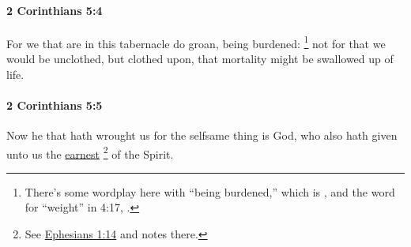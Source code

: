 		\paragraph{2 Corinthians 5:4} %
			\label{2CORINTHIANS-5-4}

			For we that are in this tabernacle do groan, being burdened:%
				\footnote{%
					There's some wordplay here with ``being burdened,'' which is , and the word for ``weight'' in 4:17, .
					}
			not for that we would be unclothed, but clothed upon, that mortality might be swallowed up of life.

			\begin{framed}
			\scriptsize
				\begin{compactdesc}
					\item[SBLG] 
				\end{compactdesc}
			\end{framed}

		\paragraph{2 Corinthians 5:5} %
			\label{2CORINTHIANS-5-5}

			Now he that hath wrought us for the selfsame thing is God, who also hath given unto us the \hyperref[EARNEST]{earnest}%
				\footnote{%
					See \hyperref[EPHESIANS-1-14]{Ephesians 1:14} and notes there.
					}
			of the Spirit.

